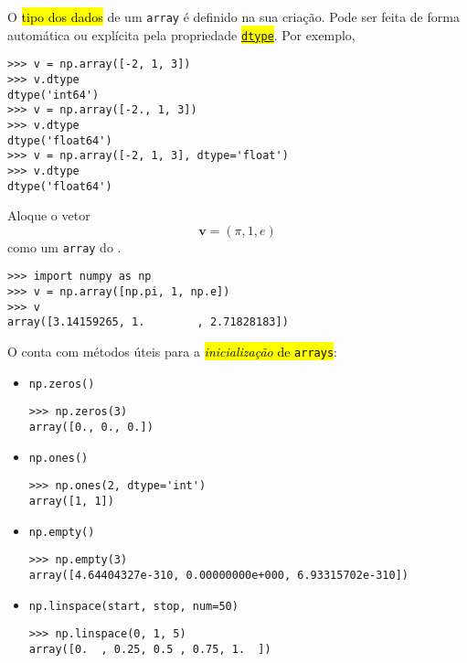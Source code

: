 O \hl{tipo dos dados} de um \lstinline+array+ é definido na sua criação. Pode ser feita de forma automática ou explícita pela propriedade \hl{{\href{https://numpy.org/doc/stable/reference/arrays.dtypes.html}{\lstinline+dtype+}}}. Por exemplo,
\begin{lstlisting}
>>> v = np.array([-2, 1, 3])
>>> v.dtype
dtype('int64')
>>> v = np.array([-2., 1, 3])
>>> v.dtype
dtype('float64')
>>> v = np.array([-2, 1, 3], dtype='float')
>>> v.dtype
dtype('float64')
\end{lstlisting}

\begin{ex}
  Aloque o vetor
  \begin{equation}
    \pmb{v} = (\pi, 1, e)
  \end{equation}
  como um \lstinline+array+ do {\numpy}.
\begin{lstlisting}
>>> import numpy as np
>>> v = np.array([np.pi, 1, np.e])
>>> v
array([3.14159265, 1.        , 2.71828183])
\end{lstlisting}
\end{ex}

O {\numpy} conta com métodos úteis para a \hl{\emph{inicialização} de {\lstinline+arrays+}}:
\begin{itemize}
\item \lstinline+np.zeros()+  
\begin{lstlisting}
>>> np.zeros(3)
array([0., 0., 0.])
\end{lstlisting}

\item \lstinline+np.ones()+ 
\begin{lstlisting}
>>> np.ones(2, dtype='int')
array([1, 1])
\end{lstlisting}

\item \lstinline+np.empty()+ 
\begin{lstlisting}
>>> np.empty(3)
array([4.64404327e-310, 0.00000000e+000, 6.93315702e-310])
\end{lstlisting}

\item \lstinline+np.linspace(start, stop, num=50)+ 
\begin{lstlisting}
>>> np.linspace(0, 1, 5)
array([0.  , 0.25, 0.5 , 0.75, 1.  ])
\end{lstlisting}
\end{itemize}

